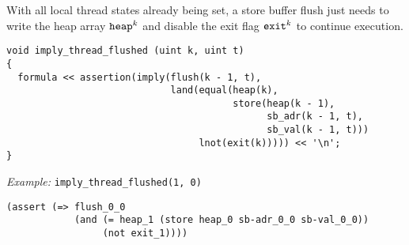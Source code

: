 
\newpage

\noindent
With all local thread states already being set,
a store buffer flush
just needs to write the heap array $\texttt{heap}^k$ and disable the exit flag $\texttt{exit}^k$ to continue execution.

\begin{lstlisting}[style=c++]
void imply_thread_flushed (uint k, uint t)
{
  formula << assertion(imply(flush(k - 1, t),
                             land(equal(heap(k),
                                        store(heap(k - 1),
                                              sb_adr(k - 1, t),
                                              sb_val(k - 1, t)))
                                  lnot(exit(k))))) << '\n';
}
\end{lstlisting}

\noindent
\emph{Example:} \lstinline[style=c++]{imply_thread_flushed(1, 0)}

\begin{lstlisting}[language=SMTLib]
(assert (=> flush_0_0
            (and (= heap_1 (store heap_0 sb-adr_0_0 sb-val_0_0))
                 (not exit_1))))
\end{lstlisting}


